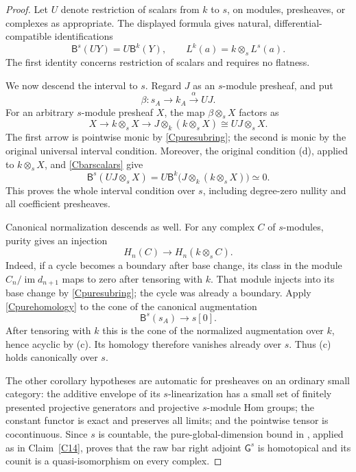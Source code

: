 \begin{proof}
Let $U$ denote restriction of scalars from $k$ to $s$, on modules, presheaves, or complexes as appropriate. The displayed formula gives natural, differential-compatible identifications
\[
 \mathsf B^s(UY)=U\mathsf B^k(Y),\qquad
 L^k(a)=k\otimes_sL^s(a).
 \tag{C-bar-scalars}\label{Cbarscalars}
\]
The first identity concerns restriction of scalars and requires no flatness.

We now descend the interval to $s$. Regard $J$ as an $s$-module presheaf, and put
\[
 \beta:s_A\longrightarrow k_A\xrightarrow{\alpha}UJ.
\]
For an arbitrary $s$-module presheaf $X$, the map $\beta\otimes_sX$ factors as
\[
 X\longrightarrow k\otimes_sX
 \longrightarrow
 J\otimes_k(k\otimes_sX)
 \cong UJ\otimes_sX.
\]
The first arrow is pointwise monic by \eqref{Cpuresubring}; the second is monic by the original universal interval condition. Moreover, the original condition (d), applied to $k\otimes_sX$, and \eqref{Cbarscalars} give
\[
 \mathsf B^s(UJ\otimes_sX)
 =U\mathsf B^k\bigl(J\otimes_k(k\otimes_sX)\bigr)
 \simeq0.
\]
This proves the whole interval condition over $s$, including degree-zero nullity and all coefficient presheaves.

Canonical normalization descends as well. For any complex $C$ of $s$-modules, purity gives an injection
\[
 H_n(C)\longrightarrow H_n(k\otimes_sC).
 \tag{C-pure-homology}\label{Cpurehomology}
\]
Indeed, if a cycle becomes a boundary after base change, its class in the module $C_n/\operatorname{im}d_{n+1}$ maps to zero after tensoring with $k$. That module injects into its base change by \eqref{Cpuresubring}; the cycle was already a boundary. Apply \eqref{Cpurehomology} to the cone of the canonical augmentation
\[
 \mathsf B^s(s_A)\longrightarrow s[0].
\]
After tensoring with $k$ this is the cone of the normalized augmentation over $k$, hence acyclic by (c). Its homology therefore vanishes already over $s$. Thus (c) holds canonically over $s$.

The other corollary hypotheses are automatic for presheaves on an ordinary small category: the additive envelope of its $s$-linearization has a small set of finitely presented projective generators and projective $s$-module Hom groups; the constant functor is exact and preserves all limits; and the pointwise tensor is cocontinuous. Since $s$ is countable, the pure-global-dimension bound in \citet[Theorem 2.6.3]{BensonGnacadja1999}, applied as in Claim~\ref{C14}, proves that the raw bar right adjoint $\mathsf G^s$ is homotopical and its counit is a quasi-isomorphism on every complex.


\end{proof}
